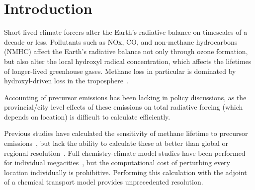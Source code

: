\section{Introduction}

Short-lived climate forcers alter the Earth's radiative balance on timescales of a decade or less. Pollutants such as NOx, CO, and non-methane hydrocarbons (NMHC) affect the Earth's radiative balance not only through ozone formation, but also alter the local hydroxyl radical concentration, which affects the lifetimes of longer-lived greenhouse gases. Methane loss in particular is dominated by hydroxyl-driven loss in the troposphere~\citep{ref:kirschke2013}.

Accounting of precursor emissions has been lacking in policy discussions, as the provincial/city level effects of these emissions on total radiative forcing (which depends on location) is difficult to calculate efficiently.

Previous studies have calculated the sensitivity of methane lifetime to precursor emissions~\citep{ref:holmes2013}, but lack the ability to calculate these at better than global or regional resolution~\citep{ref:naik2005,ref:macintosh2015}. Full chemistry-climate model studies have been performed for individual megacities~\citep{ref:dang2015}, but the computational cost of perturbing every location individually is prohibitive. Performing this calculation with the adjoint of a chemical transport model provides unprecedented resolution.